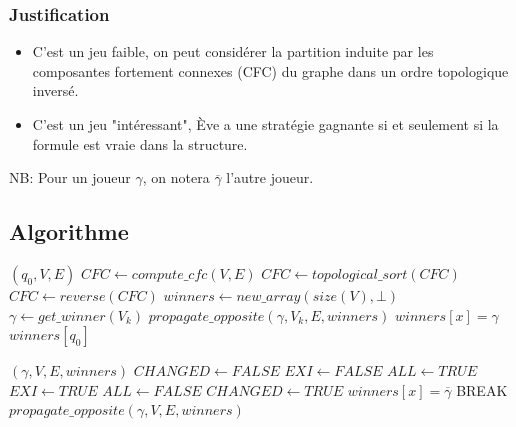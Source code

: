 \documentclass[11pt]{beamer}
\begin{document}
\begin{frame}
	\frametitle{Justification}
	\begin{itemize}
		\item C'est un jeu faible, on peut considérer la partition induite par les composantes fortement connexes (CFC) du graphe dans un ordre topologique inversé.
		\item C'est un jeu "intéressant", Ève a une stratégie gagnante si et seulement si la formule est vraie dans la structure.
	\end{itemize}
\bigskip
\pause
NB: Pour un joueur $\gamma$, on notera $\overline{\gamma}$ l'autre joueur.
\end{frame}

\subsection{Algorithme}
\footnotesize
\begin{frame}[fragile]
\begin{algorithm}[H]
    \caption{$solve\_weak\_game$}
\begin{algorithmic}[1]
    \REQUIRE $(q_0, V, E)$ 
    \STATE $CFC \leftarrow compute\_cfc(V, E)$
    \STATE $CFC \leftarrow topological\_sort(CFC)$
    \STATE $CFC \leftarrow reverse(CFC)$
    \STATE $winners \leftarrow new\_array(size(V), \bot)$
        \STATE $\gamma \leftarrow get\_winner(V_k)$
        \STATE $propagate\_opposite(\gamma, V_k, E, winners)$
                \STATE $winners[x] = \gamma$
            \ENDIF
        \ENDFOR
    \ENDFOR
    \RETURN $winners[q_0]$
\end{algorithmic}
\end{algorithm}

\end{frame}

\begin{frame}[fragile]
\begin{algorithm}[H]
\caption{$propagate\_opposite$}

\begin{algorithmic}[1]
    \scriptsize
    \REQUIRE $(\gamma, V, E, winners)$
    \STATE $CHANGED \leftarrow FALSE$
            \STATE $EXI \leftarrow FALSE$
            \STATE $ALL \leftarrow TRUE$
                    \STATE $EXI \leftarrow TRUE$
                \ELSE
                    \STATE $ALL \leftarrow FALSE$
                \ENDIF
            \ENDFOR
                \STATE $CHANGED \leftarrow TRUE$
                \STATE $winners[x] = \overline{\gamma}$
                \STATE BREAK 
            \ENDIF
        \ENDIF
    \ENDFOR
        \STATE $propagate\_opposite(\gamma, V, E, winners)$
    \ENDIF
    \RETURN
\end{algorithmic}
\end{algorithm}
\end{frame}
\end{document}

